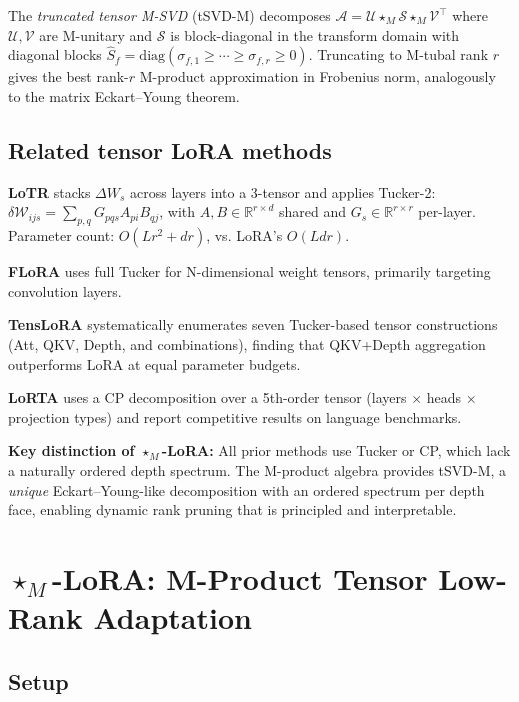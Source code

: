 \documentclass{article}
\newcommand{\R}{\mathbb{R}}
\newcommand{\cW}{\mathcal{W}}
\newcommand{\cA}{\mathcal{A}}
\newcommand{\cS}{\mathcal{S}}
\newcommand{\cU}{\mathcal{U}}
\newcommand{\cV}{\mathcal{V}}
\newcommand{\mprod}{\star_M}
\newcommand{\transpose}{^{\!\top}}
\theoremstyle{plain}
\begin{document}
The \emph{truncated tensor M-SVD} (tSVD-M) \citep{kilmer2011factorization} decomposes
$\cA = \cU \mprod \cS \mprod \cV\transpose$ where $\cU, \cV$ are M-unitary and
$\cS$ is block-diagonal in the transform domain with diagonal blocks
$\hat{S}_f = \mathrm{diag}(\sigma_{f,1} \geq \cdots \geq \sigma_{f,r} \geq 0)$.
Truncating to M-tubal rank $r$ gives the best rank-$r$ M-product approximation
in Frobenius norm, analogously to the matrix Eckart--Young theorem.

\subsection{Related tensor LoRA methods}
\label{sec:related}

\textbf{LoTR} \citep{bershatsky2024lotr} stacks $\Delta W_s$ across layers into a
3-tensor and applies Tucker-2:
$\delta\cW_{ijs} = \sum_{p,q} G_{pqs} A_{pi} B_{qj}$,
with $A, B \in \R^{r \times d}$ shared and $G_s \in \R^{r \times r}$ per-layer.
Parameter count: $O(Lr^2 + dr)$, vs. LoRA's $O(Ldr)$.

\textbf{FLoRA} \citep{si2024flora} uses full Tucker for N-dimensional weight tensors,
primarily targeting convolution layers.

\textbf{TensLoRA} \citep{marmoret2025tenslora} systematically enumerates seven
Tucker-based tensor constructions (Att, QKV, Depth, and combinations),
finding that QKV+Depth aggregation outperforms LoRA at equal parameter budgets.

\textbf{LoRTA} \citep{hounie2024lorta} uses a CP decomposition over a 5th-order tensor
(layers $\times$ heads $\times$ projection types) and report competitive results
on language benchmarks.

\textbf{Key distinction of $\star_M$-LoRA:} All prior methods use Tucker or CP, which lack
a naturally ordered depth spectrum.
The M-product algebra provides tSVD-M, a \emph{unique} Eckart--Young-like
decomposition with an ordered spectrum per depth face, enabling dynamic rank
pruning that is principled and interpretable.

\section{$\star_M$-LoRA: M-Product Tensor Low-Rank Adaptation}
\label{sec:method}

\subsection{Setup}
\label{sec:setup}
\end{document}
